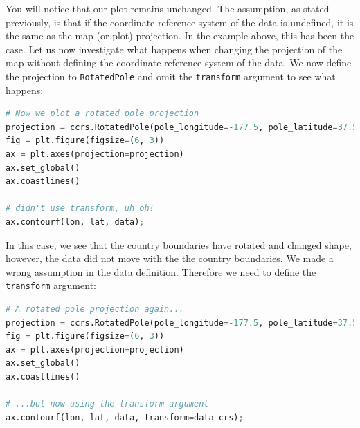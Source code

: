 \documentclass[a4paper , 12pt]{book}
\newcommand{\code}[1]{\colorbox{light-gray}{\texttt{#1}}}
\begin{document}
You will notice that our plot remains unchanged. The assumption, as stated previously, is that if the coordinate reference system of the data is undefined, it is the same as the map (or plot) projection. In the example above, this has been the case. Let us now investigate what happens when changing the projection of the map without defining the coordinate reference system of the data. We now define the projection to \code{RotatedPole} and omit the \code{transform} argument to see what happens:

\begin{center}
\begin{lstlisting}[language=Python, frame=single]
# Now we plot a rotated pole projection
projection = ccrs.RotatedPole(pole_longitude=-177.5, pole_latitude=37.5)
fig = plt.figure(figsize=(6, 3))
ax = plt.axes(projection=projection)
ax.set_global()
ax.coastlines()

# didn't use transform, uh oh!
ax.contourf(lon, lat, data); 
\end{lstlisting}
\end{center}

In this case, we see that the country boundaries have rotated and changed shape, however, the data did not move with the the country boundaries. We made a wrong assumption in the data definition. Therefore we need to define the \code{transform} argument:

\begin{center}
\begin{lstlisting}[language=Python, frame=single]
# A rotated pole projection again...
projection = ccrs.RotatedPole(pole_longitude=-177.5, pole_latitude=37.5)
fig = plt.figure(figsize=(6, 3))
ax = plt.axes(projection=projection)
ax.set_global()
ax.coastlines()

# ...but now using the transform argument
ax.contourf(lon, lat, data, transform=data_crs);
\end{lstlisting}
\end{center}
\end{document}
